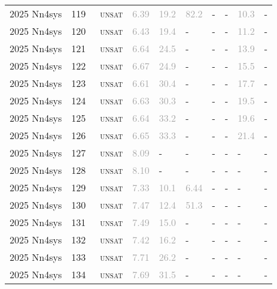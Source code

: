 \begin{center}
{\begin{longtable}{@{}llllllllll@{}}
2025 Nn4sys & 119 & ~\textsc{unsat} & \textcolor{darkgray}{6.39} & \textcolor{darkgray}{19.2} & \textcolor{darkgray}{82.2} & - & - & \textcolor{darkgray}{10.3} & - \\
2025 Nn4sys & 120 & ~\textsc{unsat} & \textcolor{darkgray}{6.43} & \textcolor{darkgray}{19.4} & - & - & - & \textcolor{darkgray}{11.2} & - \\
2025 Nn4sys & 121 & ~\textsc{unsat} & \textcolor{darkgray}{6.64} & \textcolor{darkgray}{24.5} & - & - & - & \textcolor{darkgray}{13.9} & - \\
2025 Nn4sys & 122 & ~\textsc{unsat} & \textcolor{darkgray}{6.67} & \textcolor{darkgray}{24.9} & - & - & - & \textcolor{darkgray}{15.5} & - \\
2025 Nn4sys & 123 & ~\textsc{unsat} & \textcolor{darkgray}{6.61} & \textcolor{darkgray}{30.4} & - & - & - & \textcolor{darkgray}{17.7} & - \\
2025 Nn4sys & 124 & ~\textsc{unsat} & \textcolor{darkgray}{6.63} & \textcolor{darkgray}{30.3} & - & - & - & \textcolor{darkgray}{19.5} & - \\
2025 Nn4sys & 125 & ~\textsc{unsat} & \textcolor{darkgray}{6.64} & \textcolor{darkgray}{33.2} & - & - & - & \textcolor{darkgray}{19.6} & - \\
2025 Nn4sys & 126 & ~\textsc{unsat} & \textcolor{darkgray}{6.65} & \textcolor{darkgray}{33.3} & - & - & - & \textcolor{darkgray}{21.4} & - \\
2025 Nn4sys & 127 & ~\textsc{unsat} & \textcolor{darkgray}{8.09} & - & - & - & - & - & - \\
2025 Nn4sys & 128 & ~\textsc{unsat} & \textcolor{darkgray}{8.10} & - & - & - & - & - & - \\
2025 Nn4sys & 129 & ~\textsc{unsat} & \textcolor{darkgray}{7.33} & \textcolor{darkgray}{10.1} & \textcolor{darkgray}{6.44} & - & - & - & - \\
2025 Nn4sys & 130 & ~\textsc{unsat} & \textcolor{darkgray}{7.47} & \textcolor{darkgray}{12.4} & \textcolor{darkgray}{51.3} & - & - & - & - \\
2025 Nn4sys & 131 & ~\textsc{unsat} & \textcolor{darkgray}{7.49} & \textcolor{darkgray}{15.0} & - & - & - & - & - \\
2025 Nn4sys & 132 & ~\textsc{unsat} & \textcolor{darkgray}{7.42} & \textcolor{darkgray}{16.2} & - & - & - & - & - \\
2025 Nn4sys & 133 & ~\textsc{unsat} & \textcolor{darkgray}{7.71} & \textcolor{darkgray}{26.2} & - & - & - & - & - \\
2025 Nn4sys & 134 & ~\textsc{unsat} & \textcolor{darkgray}{7.69} & \textcolor{darkgray}{31.5} & - & - & - & - & - \\

\end{longtable}}
\end{center}
